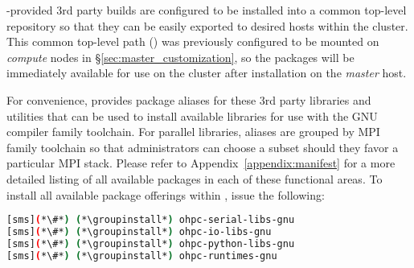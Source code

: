 \begin{center}
\begin{tcolorbox}[]
\small
\OHPC{}-provided 3rd party builds are configured to be installed
into a common top-level repository so that they can be easily exported to
desired hosts within the cluster. This common top-level path
() was previously configured to be mounted on {\em
 compute} nodes in \S\ref{sec:master_customization}, so the packages will be
immediately available for use on the cluster after installation on the {\em
 master} host.
\end{tcolorbox}
\end{center}


For convenience, \OHPC{} provides package aliases for these 3rd party libraries
and utilities that can be used to install available libraries for use with the
GNU compiler family toolchain. For parallel libraries, aliases are grouped by
MPI family toolchain so that administrators can choose a subset should they
favor a particular MPI stack.  Please refer to Appendix~\ref{appendix:manifest}
for a more detailed listing of all available packages in each of these functional
areas. To install all available package offerings within \OHPC{}, issue the
following:

\begin{lstlisting}[language=bash,keywords={},upquote=true,keepspaces]
[sms](*\#*) (*\groupinstall*) ohpc-serial-libs-gnu
[sms](*\#*) (*\groupinstall*) ohpc-io-libs-gnu
[sms](*\#*) (*\groupinstall*) ohpc-python-libs-gnu
[sms](*\#*) (*\groupinstall*) ohpc-runtimes-gnu
\end{lstlisting}



